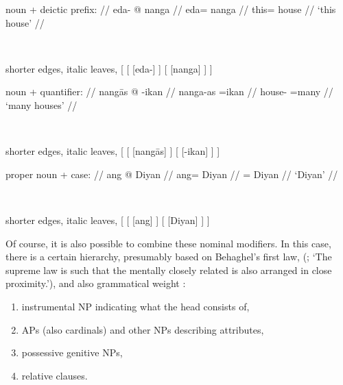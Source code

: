 \pex\label{ex:nouncltree}
\a %
	\begin{minipage}[t]{.5\linewidth}
	\begingl
		\glpreamble noun + deictic prefix: //
		\gla eda- @ nanga //
		\glb eda= nanga //
		\glc this= house //
		\glft `this house' //
	\endgl
	\end{minipage}
	~
	\begin{forest} shorter edges, italic leaves,
	[
		[
			[eda-]
		]
		[
			[nanga]
		]
	]
	\end{forest}

\a %
	\begin{minipage}[t]{.5\linewidth}
	\begingl
		\glpreamble noun + quantifier: //
		\gla nangās @ -ikan //
		\glb nanga-as =ikan //
		\glc house-\Parg{} =many //
		\glft `many houses' //
	\endgl
	\end{minipage}
	~
	\begin{forest} shorter edges, italic leaves,
	[
		[
			[nangās]
		]
		[
			[-ikan]
		]
	]
	\end{forest}

\a %
	\begin{minipage}[t]{.5\linewidth}
	\begingl
		\glpreamble proper noun + case: //
		\gla ang @ Diyan //
		\glb ang= Diyan //
		\glc \Aarg{}= Diyan //
		\glft `Diyan' //
	\endgl
	\end{minipage}
	~
	\begin{forest} shorter edges, italic leaves,
	[
		[
			[ang]
		]
		[
			[Diyan]
		]
	]
	\end{forest}

\xe

Of course, it is also possible to combine these nominal modifiers. In this
case, there is a certain hierarchy, presumably based on Behaghel's first law,
 (\cite[4]{behaghel1932}; `The supreme law is
such that the mentally closely related is also arranged in close proximity.'), 
and also grammatical weight \citep{wasow1997}:

\begin{enumerate}[noitemsep]
	\item instrumental NP indicating what the head consists of,
	\item APs (also cardinals) and other NPs describing attributes,
	\item possessive genitive NPs,
	\item relative clauses.
\end{enumerate}

